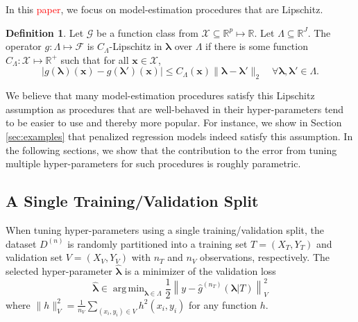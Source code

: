 \documentclass[12pt]{article} %
\theoremstyle{definition}
\newtheorem{definition}{Definition}
\newcommand{\textred}[1]{\textcolor{red}{#1}}
\DeclareMathOperator*{\argmin}{arg\,min}
\begin{document}
In this \textred{paper}, we focus on model-estimation procedures that are Lipschitz.
\begin{definition}
	\label{def:smooth_funcs}
	Let $\mathcal{G}$ be a function class from $\mathcal{X} \subseteq \mathbb{R}^p \mapsto \mathbb{R}$.
	Let $\Lambda \subseteq \mathbb{R}^J$.
	The operator $g: \Lambda \mapsto \mathcal{F}$ is $C_\Lambda$-Lipschitz in $\boldsymbol{\lambda}$ over $\Lambda$ if there is some function $C_{\Lambda}:\mathcal{X} \mapsto \mathbb{R}^+$ such that for all $\boldsymbol{x} \in \mathcal{X}$,
	\begin{equation}
	\left | g(\boldsymbol \lambda)(\boldsymbol{x}) - g(\boldsymbol \lambda ')(\boldsymbol{x}) \right |
	\le
	C_{\Lambda}(\boldsymbol{x}) \| \boldsymbol \lambda - \boldsymbol \lambda' \|_2 
	\quad
	\forall \boldsymbol \lambda,\boldsymbol \lambda' \in \Lambda.
	\label{eq:smooth_funcs}
	\end{equation}
\end{definition}
We believe that many model-estimation procedures satisfy this Lipschitz assumption as procedures that are well-behaved in their hyper-parameters tend to be easier to use and thereby more popular.
For instance, we show in Section \ref{sec:examples} that penalized regression models indeed satisfy this assumption.
In the following sections, we show that the contribution to the error from tuning multiple hyper-parameters for such procedures is roughly parametric.

\subsection{A Single Training/Validation Split}\label{sec:single}

When tuning hyper-parameters using a single training/validation split, the dataset $D^{(n)}$ is randomly partitioned into a training set $T = (X_T, Y_T)$ and validation set $V = (X_V, Y_V)$ with $n_T$ and $n_V$ observations, respectively.
The selected hyper-parameter $\hat{\boldsymbol{\lambda}}$ is a minimizer of the validation loss
\begin{equation}
\label{eq:train_val_lambda}
\hat{\boldsymbol \lambda} \in \argmin_{\boldsymbol{\lambda} \in\Lambda} \frac{1}{2} \left \| y-\hat{g}^{(n_T)}( \boldsymbol \lambda | T) \right \|_{V}^{2}
\end{equation}
where $\| h \|^2_{V}=\frac{1}{n_V}\sum_{(x_i, y_i)\in V} h^2(x_i, y_i)$ for any function $h$.
\end{document}
